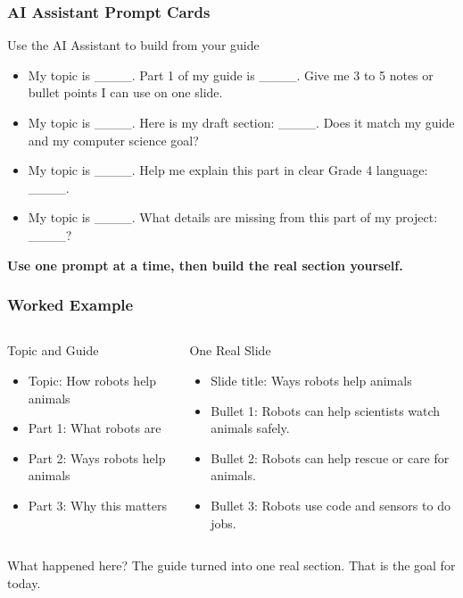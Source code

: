 \documentclass[aspectratio=169]{beamer}
\begin{document}
\begin{frame}[plain]
\frametitle{AI Assistant Prompt Cards}
\begin{block}{Use the AI Assistant to build from your guide}
\begin{itemize}
\large
\item My topic is \_\_\_\_. Part 1 of my guide is \_\_\_\_. Give me 3 to 5 notes or bullet points I can use on one slide.
\item My topic is \_\_\_\_. Here is my draft section: \_\_\_\_. Does it match my guide and my computer science goal?
\item My topic is \_\_\_\_. Help me explain this part in clear Grade 4 language: \_\_\_\_.
\item My topic is \_\_\_\_. What details are missing from this part of my project: \_\_\_\_?
\end{itemize}
\end{block}
\vspace{0.2cm}
\begin{center}
\Large\bfseries Use one prompt at a time, then build the real section yourself.
\end{center}
\end{frame}

\begin{frame}[plain]
\frametitle{Worked Example}
\begin{columns}[T,totalwidth=\textwidth]
\begin{block}{Topic and Guide}
\begin{itemize}
\large
\item Topic: How robots help animals
\item Part 1: What robots are
\item Part 2: Ways robots help animals
\item Part 3: Why this matters
\end{itemize}
\end{block}
\begin{block}{One Real Slide}
\begin{itemize}
\large
\item Slide title: Ways robots help animals
\item Bullet 1: Robots can help scientists watch animals safely.
\item Bullet 2: Robots can help rescue or care for animals.
\item Bullet 3: Robots use code and sensors to do jobs.
\end{itemize}
\end{block}
\end{columns}
\vspace{0.15cm}
\begin{block}{What happened here?}
\large The guide turned into one real section. That is the goal for today.
\end{block}
\end{frame}
\end{document}
